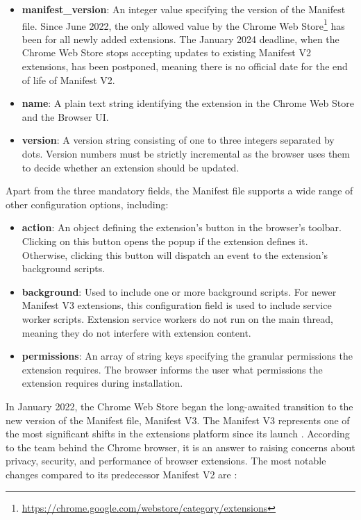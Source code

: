 \begin{itemize}
	\item \textbf{manifest\_version}: An integer value specifying the version of the Manifest file. Since June 2022, the only allowed value by the Chrome Web Store\footnote{{\url{https://chrome.google.com/webstore/category/extensions}}} has been  for all newly added extensions. The January 2024 deadline, when the Chrome Web Store stops accepting updates to existing Manifest V2 extensions, has been postponed, meaning there is no official date for the end of life of Manifest V2.
	\item \textbf{name}: A plain text string identifying the extension in the Chrome Web Store and the Browser UI.
	\item \textbf{version}: A version string consisting of one to three integers separated by dots. Version numbers must be strictly incremental as the browser uses them to decide whether an extension should be updated.
\end{itemize}

Apart from the three mandatory fields, the Manifest file supports a wide range of other configuration options, including:

\begin{itemize}
	\item \textbf{action}: An object defining the extension's button in the browser's toolbar. Clicking on this button opens the popup if the extension defines it. Otherwise, clicking this button will dispatch an event to the extension's background scripts.
	\item \textbf{background}: Used to include one or more background scripts. For newer Manifest V3 extensions, this configuration field is used to include service worker scripts. Extension service workers do not run on the main thread, meaning they do not interfere with extension content.
	\item \textbf{permissions}: An array of string keys specifying the granular permissions the extension requires. The browser informs the user what permissions the extension requires during installation.
\end{itemize}

In January 2022, the Chrome Web Store began the long-awaited transition to the new version of the Manifest file, Manifest V3. The Manifest V3 represents one of the most significant shifts in the extensions platform since its launch \cite{ChromeWebExtensions}. According to the team behind the Chrome browser, it is an answer to raising concerns about privacy, security, and performance of browser extensions. The most notable changes compared to its predecessor Manifest V2 are \cite{ChromeWebExtensions}:

